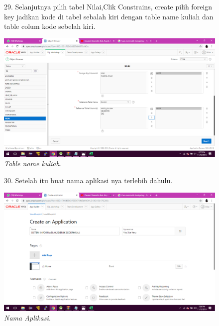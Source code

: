 \begin{enumerate}
\begin{figure}
\item[29.] Selanjutnya pilih tabel Nilai,Clik Constrains, create pilih foreign key jadikan kode di tabel sebalah kiri dengan table name kuliah dan table colum kode sebelah kiri.    
    \begin{center}
    \includegraphics[scale=0.3]{figures/52.png}
    \caption{\textit{Table name kuliah.}}
    \end{center}
    \label{gambar}
    \end{figure}

\begin{figure}
\item[30.] Setelah itu buat nama aplikasi nya terlebih dahulu.
    \begin{center}
    \includegraphics[scale=0.3]{figures/56.png}
    \caption{\textit{Nama Aplikasi.}}
    \end{center}
    \label{gambar}
    \end{figure} 
   

\end{enumerate}
